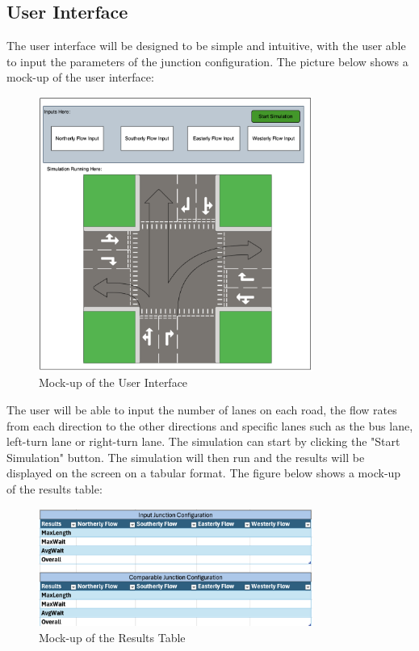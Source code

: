 \documentclass{article}
\begin{document}
\subsection{User Interface}
The user interface will be designed to be simple and intuitive, with the user able to input the parameters of the junction configuration.
The picture below shows a mock-up of the user interface:

\begin{figure}[H]
    \centering
    \includegraphics[width=0.8\textwidth]{frontendUI.png}
    \caption{Mock-up of the User Interface}
    \label{frontendUI}
\end{figure}

The user will be able to input the number of lanes on each road, the flow rates from each direction to the other directions and specific lanes such
as the bus lane, left-turn lane or right-turn lane. The simulation can start by clicking the "Start Simulation" button. The simulation will then run and the results will be displayed on the screen on a tabular format.
The figure below shows a mock-up of the results table:

\begin{figure}[H]
    \centering
    \includegraphics[width=0.8\textwidth]{frontendoutput.png}
    \caption{Mock-up of the Results Table}
    \label{frontendoutput}
\end{figure}
\end{document}

